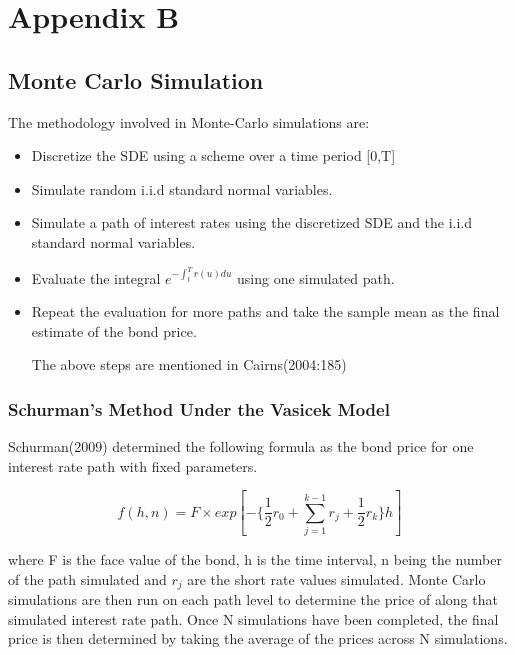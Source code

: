 \documentclass[12pt,a4paper]{article}
\begin{document}
\newpage
\section{Appendix B}
\label{sec: Appendix B}
\subsection{Monte Carlo Simulation}
\label{subsec: MC}
The methodology involved in Monte-Carlo simulations are:

\begin{itemize}
	\item Discretize the SDE using a scheme over a time period [0,T]
	\item Simulate random i.i.d standard normal variables.
	\item Simulate a path of interest rates using the discretized SDE and the i.i.d standard normal variables.
	\item Evaluate the integral $e^{-\int_{t}^{T} r(u)du}$ using one simulated path.
	\item Repeat the evaluation for more paths and take the sample mean as the final estimate of the bond price.
	
	The above steps are mentioned in Cairns(2004:185)
\end{itemize}



\subsubsection{Schurman's Method Under the Vasicek Model}
\label{subsubsec: Schurman}

Schurman(2009) determined the following formula as the bond price for one interest rate path with fixed parameters.  

$$f(h,n)=F\times exp[-\{\frac{1}{2}r_{0}+\sum_{j=1}^{k-1}r_{j} +\frac{1}{2}r_{k}\}h]$$

where F is the face value of the bond, h is the time interval, n being the number of the path simulated and $r_{j}$ are the short rate values simulated. Monte Carlo simulations are then run on each path level to determine the price of along that simulated interest rate path. Once N simulations have been completed, the final price is then determined by taking the average of the prices across N simulations.   
\end{document}
